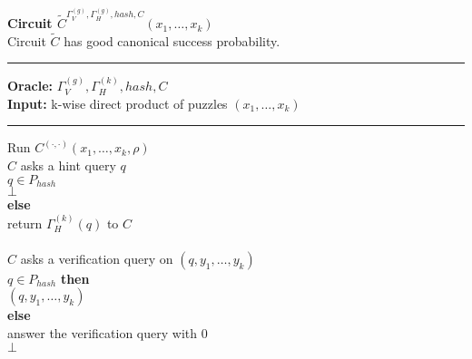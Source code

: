 %
%
\begin{codeblock}
  \textbf{Circuit $\widetilde{C}^{\Gamma_V^{(g)}, \Gamma_H^{(g)}, hash, C} (x_1, \dots, x_k)$} \\
  Circuit $\widetilde{C}$ has good canonical success probability.
  \medskip

  \hrule

  \medskip

  \textbf{Oracle:} $\Gamma_V^{(g)}, \Gamma_H^{(k)}, hash, C$ \\
  \textbf{Input:} k-wise direct product of puzzles $(x_1, \dots, x_k)$

  \medskip\hrule\medskip
  Run $C^{(\cdot,\cdot)}(x_1, \dots, x_k, \rho)$ \\
  \IndI \If $C$ asks a hint query $q$ \then\\
  \IndII \If $q \in P_{hash}$ \then\\
  \IndIII \return $\bot$\\
  \IndII \textbf{else}\\
  \IndIII return $\Gamma_H^{(k)}(q)$ to $C$\\
  \\
  \IndI \If $C$ asks a verification query on $(q, y_1, \dots, y_k)$ \then \\
  \IndII \If $q \in P_{hash}$ \textbf{then} \\
  \IndIII \return $(q, y_1, \dots, y_k)$ \\
  \IndII \textbf{else} \\
  \IndIII answer the verification query with 0 \\
  \return $\bot$
\end{codeblock}
%
%
